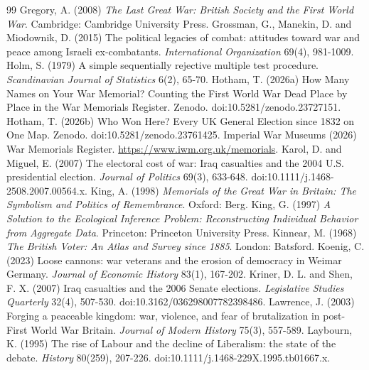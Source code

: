 \documentclass[11pt,a4paper]{article}
\begin{document}
\begin{thebibliography}{99}
 Gregory, A. (2008) \textit{The Last Great War: British Society and the First World War}. Cambridge: Cambridge University Press.
 Grossman, G., Manekin, D. and Miodownik, D. (2015) The political legacies of combat: attitudes toward war and peace among Israeli ex-combatants. \textit{International Organization} 69(4), 981-1009.
 Holm, S. (1979) A simple sequentially rejective multiple test procedure. \textit{Scandinavian Journal of Statistics} 6(2), 65-70.
 Hotham, T. (2026a) How Many Names on Your War Memorial? Counting the First World War Dead Place by Place in the War Memorials Register. Zenodo. doi:10.5281/zenodo.23727151.
 Hotham, T. (2026b) Who Won Here? Every UK General Election since 1832 on One Map. Zenodo. doi:10.5281/zenodo.23761425.
 Imperial War Museums (2026) War Memorials Register. \url{https://www.iwm.org.uk/memorials}.
 Karol, D. and Miguel, E. (2007) The electoral cost of war: Iraq casualties and the 2004 U.S. presidential election. \textit{Journal of Politics} 69(3), 633-648. doi:10.1111/j.1468-2508.2007.00564.x.
 King, A. (1998) \textit{Memorials of the Great War in Britain: The Symbolism and Politics of Remembrance}. Oxford: Berg.
 King, G. (1997) \textit{A Solution to the Ecological Inference Problem: Reconstructing Individual Behavior from Aggregate Data}. Princeton: Princeton University Press.
 Kinnear, M. (1968) \textit{The British Voter: An Atlas and Survey since 1885}. London: Batsford.
 Koenig, C. (2023) Loose cannons: war veterans and the erosion of democracy in Weimar Germany. \textit{Journal of Economic History} 83(1), 167-202.
 Kriner, D. L. and Shen, F. X. (2007) Iraq casualties and the 2006 Senate elections. \textit{Legislative Studies Quarterly} 32(4), 507-530. doi:10.3162/036298007782398486.
 Lawrence, J. (2003) Forging a peaceable kingdom: war, violence, and fear of brutalization in post-First World War Britain. \textit{Journal of Modern History} 75(3), 557-589.
 Laybourn, K. (1995) The rise of Labour and the decline of Liberalism: the state of the debate. \textit{History} 80(259), 207-226. doi:10.1111/j.1468-229X.1995.tb01667.x.

\end{thebibliography}
\end{document}
